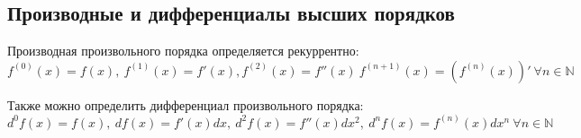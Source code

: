 \subsection{Производные и дифференциалы высших порядков}
Производная произвольного порядка определяется рекуррентно:
\begin{equation*}
f^{(0)}(x) = f(x), \ f^{(1)}(x) = f'(x), f^{(2)}(x) = f''(x) \ f^{(n + 1)}(x) = (f^{(n)}(x))' \ \forall n \in \mathbb N
\end{equation*}

Также можно определить дифференциал произвольного порядка:
\begin{equation*}
d^0 f(x) = f(x), \ df(x) = f'(x)dx, \ d^2 f(x) = f''(x) dx^2, \ d^n f(x) = f^{(n)}(x) dx^n \ \forall n \in \mathbb N
\end{equation*}